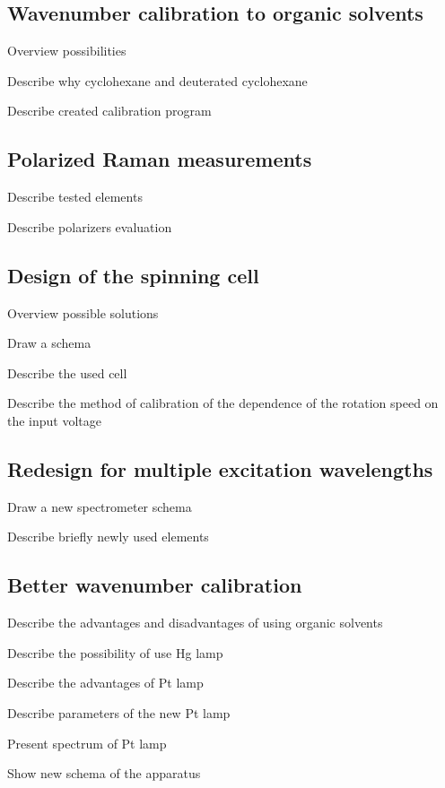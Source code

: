 \subsection{Wavenumber calibration to organic solvents}
\begin{docitemize}
	\item Overview possibilities
	\item Describe why cyclohexane and deuterated cyclohexane
	\item Describe created calibration program
\end{docitemize}


\subsection{Polarized Raman measurements}
\begin{docitemize}
	\item Describe tested elements
	\item Describe polarizers evaluation
\end{docitemize}


\subsection{Design of the spinning cell}
\begin{docitemize}
	\item Overview possible solutions
	\item Draw a schema
	\item Describe the used cell
	\item Describe the method of calibration of the dependence of the rotation
	speed on the input voltage
\end{docitemize}


\subsection{Redesign for multiple excitation wavelengths}
\begin{docitemize}
	\item Draw a new spectrometer schema
	\item Describe briefly newly used elements
\end{docitemize}


\subsection{Better wavenumber calibration}
\begin{docitemize}
	\item Describe the advantages and disadvantages of using organic solvents
	\item Describe the possibility of use Hg lamp
	\item Describe the advantages of Pt lamp
	\item Describe parameters of the new Pt lamp
	\item Present spectrum of Pt lamp
	\item Show new schema of the apparatus
\end{docitemize}


